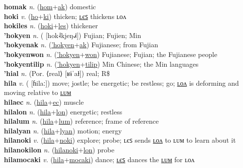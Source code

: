 \textbf{homak} \textit{n.} (\hyperref[hom]{hom}+\hyperref[ak]{ak})
domestic \label{homak} \\
\textbf{hoki} \textit{v.} (\hyperref[ho]{ho}+\hyperref[ki]{ki})
thicken; \hyperref[hokiles]{ʟєꜱ} thickens ʟᴏᴧ \label{hoki} \\
\textbf{hokiles} \textit{n.} (\hyperref[hoki]{hoki}+\hyperref[les]{les})
thickener \label{hokiles} \\
\textbf{'hokyen} \textit{n.} ( [hok˨kjeŋ˨˩˧])
Fujian; Fujien; Min \label{'hokyen} \\
\textbf{'hokyenak} \textit{n.} (\hyperref['hokyen]{'hokyen}+\hyperref[ak]{ak})
Fujianese; from Fujian \label{'hokyenak} \\
\textbf{'hokyenwon} \textit{n.} (\hyperref['hokyen]{'hokyen}+\hyperref[won]{won})
Fujianese; Fujian; the Fujianese people \label{'hokyenwon} \\
\textbf{'hokyentilip} \textit{n.} (\hyperref['hokyen]{'hokyen}+\hyperref[tilip]{tilip})
Min Chinese; the Min languages \label{'hokyentilip} \\
\textbf{'hial} \textit{n.} (Por. ⟨real⟩ [ʁɨˈaɫ])
real; R\$ \label{'hial} \\
\textbf{hila} \textit{v.} ( [ɦilaː])
move; jostle; be energetic; be restless; go; \hyperref[hilalon]{ʟᴏᴧ} is deforming and moving relative to \hyperref[hilalum]{ʟᴜᴍ} \label{hila} \\
\textbf{hilaec} \textit{n.} (\hyperref[hila]{hila}+\hyperref[ec]{ec})
muscle \label{hilaec} \\
\textbf{hilalon} \textit{n.} (\hyperref[hila]{hila}+\hyperref[lon]{lon})
energetic; restless \label{hilalon} \\
\textbf{hilalum} \textit{n.} (\hyperref[hila]{hila}+\hyperref[lum]{lum})
reference; frame of reference \label{hilalum} \\
\textbf{hilalyan} \textit{n.} (\hyperref[hila]{hila}+\hyperref[lyan]{lyan})
motion; energy \label{hilalyan} \\
\textbf{hilanoki} \textit{v.} (\hyperref[hila]{hila}+\hyperref[noki]{noki})
explore; probe; ʟєꜱ sends \hyperref[hilanokilon]{ʟᴏᴧ} to ʟᴜᴍ to learn about it \label{hilanoki} \\
\textbf{hilanokilon} \textit{n.} (\hyperref[hilanoki]{hilanoki}+\hyperref[lon]{lon})
probe \label{hilanokilon} \\
\textbf{hilamocaki} \textit{v.} (\hyperref[hila]{hila}+\hyperref[mocaki]{mocaki})
dance; \hyperref[hilamocakiles]{ʟєꜱ} dances the \hyperref[hilamocakilum]{ʟᴜᴍ} for ʟᴏᴧ \label{hilamocaki} \\
